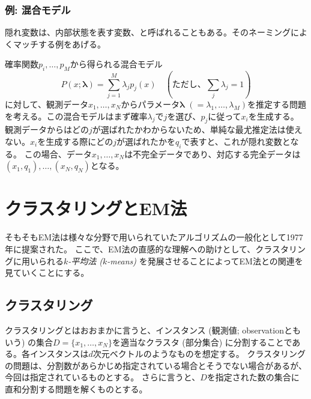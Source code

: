 \documentclass[9pt,draft,twocolumn]{jsarticle}
\begin{document}
\subsubsection{例: 混合モデル}
隠れ変数は、内部状態を表す変数、と呼ばれることもある。そのネーミングによくマッチする例をあげる。

確率関数$p_i, \ldots,
p_M$から得られる混合モデル \[ P(x;\bm{\lambda})= \sum_{j=1}^M \lambda_j p_j(x) \quad
(\text{ただし、} \sum_j \lambda_j =1)
\]
に対して、観測データ$x_1,\ldots,x_N$からパラメータ$\bm{\lambda}$
$(=\lambda_1,\ldots,\lambda_M)$を推定する問題を考える。この混合モデルはまず確率$\lambda_j$で$j$を選び、$p_j$に従って$x_i$を生成する。
観測データからはどの$j$が選ばれたかわからないため、単純な最尤推定法は使えない。$x_i$を生成する際にどの$j$が選ばれたかを$q_i$で表すと、これが隠れ変数となる。 この場合、データ$x_1,\ldots,x_N$は不完全データであり、対応する完全データは$(x_1,q_1),\ldots,(x_N,q_N)$となる。
\section{クラスタリングとEM法}
そもそもEM法は様々な分野で用いられていたアルゴリズムの一般化として1977年に提案された。
ここで、EM法の直感的な理解への助けとして、クラスタリングに用いられる\emph{$k$-平均法 ($k$-means)}
を発展させることによってEM法との関連を見ていくことにする。

\subsection{クラスタリング}
クラスタリングとはおおまかに言うと、インスタンス
(観測値; observationともいう)
の集合$D=\{x_1,\ldots,x_N\}$を適当なクラスタ (部分集合) に分割することである。各インスタンスは$d$次元ベクトルのようなものを想定する。
クラスタリングの問題は、分割数があらかじめ指定されている場合とそうでない場合があるが、 今回は指定されているものとする。
さらに言うと、$D$を指定された数の集合に直和分割する問題を解くものとする。
\end{document}
